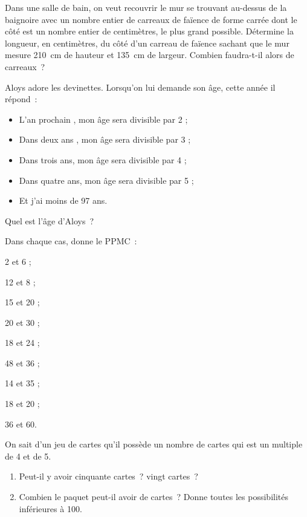 \begin{exercice}[Carrelage]
Dans une salle de bain, on veut recouvrir le mur se trouvant au-dessus de la baignoire avec un nombre entier de carreaux de faïence de forme carrée dont le côté est un nombre entier de centimètres, le plus grand possible. Détermine la longueur, en centimètres, du côté d'un carreau de faïence sachant que le mur mesure 210 cm de hauteur et 135 cm de largeur. Combien faudra-t-il alors de carreaux ?
\end{exercice}

\begin{exercice}
Aloys adore les devinettes. Lorsqu'on lui demande son âge, cette année il répond :
\begin{itemize}
 \item L'an prochain , mon âge sera divisible par 2 ;
 \item Dans deux ans , mon âge sera divisible par 3 ;
 \item Dans trois ans, mon âge sera divisible par 4 ;
 \item Dans quatre ans, mon âge sera divisible par 5 ;
 \item Et j'ai moins de 97 ans.
 \end{itemize}
Quel est l'âge d'Aloys ?
\end{exercice}




\begin{exercice}[PPMC]
Dans chaque cas, donne le PPMC :
\begin{colenumerate}{3}
 \item 2 et 6 ;
 \item 12 et 8 ;
 \item 15 et 20 ;
 \item 20 et 30 ;
 \item 18 et 24 ;
 \item 48 et 36 ;
 \item 14 et 35 ;
 \item 18 et 20 ;
 \item 36 et 60.
 \end{colenumerate}
\end{exercice}

\begin{exercice}
On sait d'un jeu de cartes qu’il possède un nombre de cartes qui est un multiple de 4 et de 5.
\begin{enumerate}
 \item Peut-il y avoir cinquante cartes ? vingt cartes ?
 \item Combien le paquet peut-il avoir de cartes ? Donne toutes les possibilités inférieures à 100.
 \end{enumerate}
\end{exercice}

